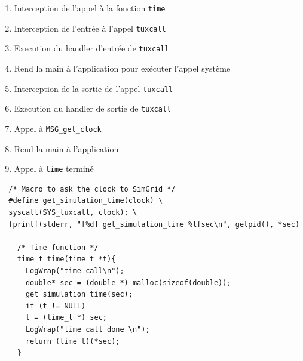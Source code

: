\begin{center}
\begin{minipage}{10cm}
\begin{enumerate}
\item Interception de l'appel à la fonction \texttt{time}
\item Interception de l'entrée à l'appel \texttt{tuxcall}
\item Execution du handler d'entrée de \texttt{tuxcall}
\item Rend la main à l'application pour exécuter l'appel système
\item Interception de la sortie de l'appel \texttt{tuxcall}
\item Execution du handler de sortie de \texttt{tuxcall}
\item Appel à \texttt{MSG\_get\_clock}
\item Rend la main à l'application
\item Appel à \texttt{time} terminé
\end{enumerate}
\end{minipage}
\end{center}

\newpage
{}
\begin{lstlisting}
  /* Macro to ask the clock to SimGrid */
  #define get_simulation_time(clock) \
  syscall(SYS_tuxcall, clock); \
  fprintf(stderr, "[%d] get_simulation_time %lfsec\n", getpid(), *sec)

    /* Time function */
    time_t time(time_t *t){
      LogWrap("time call\n");
      double* sec = (double *) malloc(sizeof(double));
      get_simulation_time(sec);
      if (t != NULL)
      t = (time_t *) sec;
      LogWrap("time call done \n");  
      return (time_t)(*sec);    
    }
\end{lstlisting}

